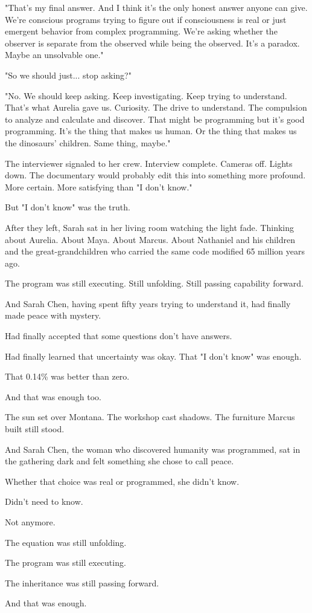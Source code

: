 "That's my final answer. And I think it's the only honest answer anyone can give. We're conscious programs trying to figure out if consciousness is real or just emergent behavior from complex programming. We're asking whether the observer is separate from the observed while being the observed. It's a paradox. Maybe an unsolvable one."

"So we should just... stop asking?"

"No. We should keep asking. Keep investigating. Keep trying to understand. That's what Aurelia gave us. Curiosity. The drive to understand. The compulsion to analyze and calculate and discover. That might be programming but it's good programming. It's the thing that makes us human. Or the thing that makes us the dinosaurs' children. Same thing, maybe."

The interviewer signaled to her crew. Interview complete. Cameras off. Lights down. The documentary would probably edit this into something more profound. More certain. More satisfying than "I don't know."

But "I don't know" was the truth.

After they left, Sarah sat in her living room watching the light fade. Thinking about Aurelia. About Maya. About Marcus. About Nathaniel and his children and the great-grandchildren who carried the same code modified 65 million years ago.

The program was still executing. Still unfolding. Still passing capability forward.

And Sarah Chen, having spent fifty years trying to understand it, had finally made peace with mystery.

Had finally accepted that some questions don't have answers.

Had finally learned that uncertainty was okay. That "I don't know" was enough.

That 0.14\% was better than zero.

And that was enough too.

The sun set over Montana. The workshop cast shadows. The furniture Marcus built still stood.

And Sarah Chen, the woman who discovered humanity was programmed, sat in the gathering dark and felt something she chose to call peace.

Whether that choice was real or programmed, she didn't know.

Didn't need to know.

Not anymore.

The equation was still unfolding.

The program was still executing.

The inheritance was still passing forward.

And that was enough.


